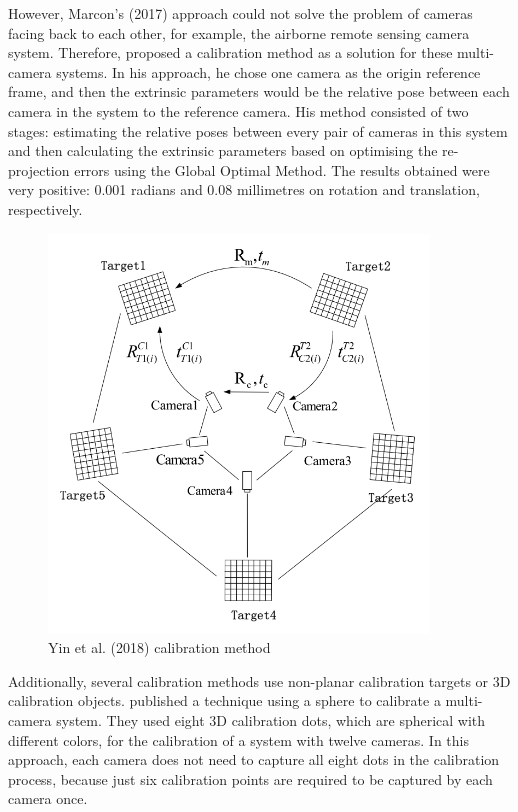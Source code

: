 However, Marcon's (2017) approach could not solve the problem of cameras facing back to each other, for example, the airborne remote sensing camera system. Therefore, \cite{Yin2018} proposed a calibration method as a solution for these multi-camera systems. In his approach, he chose one camera as the origin reference frame, and then the extrinsic parameters would be the relative pose between each camera in the system to the reference camera. His method consisted of two stages: estimating the relative poses between every pair of cameras in this system and then calculating the extrinsic parameters based on optimising the re-projection errors using the Global Optimal Method. The results obtained were very positive: 0.001 radians and 0.08 millimetres on rotation and translation, respectively.

\begin{figure}[ht]
\centering
\includegraphics[width=0.9\textwidth]{Images/Yin et al. (2018).png}
\caption{Yin et al. (2018) calibration method}
\end{figure}

\clearpage
Additionally, several calibration methods use non-planar calibration targets or 3D calibration objects. \cite{Shen2011} published a technique using a sphere to calibrate a multi-camera system. They used eight 3D calibration dots, which are spherical with different colors, for the calibration of a system with twelve cameras. In this approach, each camera does not need to capture all eight dots in the calibration process, because just six calibration points are required to be captured by each camera once.



